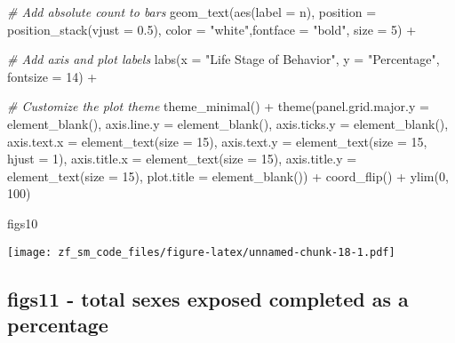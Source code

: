 \documentclass[
]{article}
\newenvironment{Shaded}{\begin{snugshade}}{\end{snugshade}}
\newcommand{\AttributeTok}[1]{\textcolor[rgb]{0.77,0.63,0.00}{#1}}
\newcommand{\CommentTok}[1]{\textcolor[rgb]{0.56,0.35,0.01}{\textit{#1}}}
\newcommand{\DecValTok}[1]{\textcolor[rgb]{0.00,0.00,0.81}{#1}}
\newcommand{\FloatTok}[1]{\textcolor[rgb]{0.00,0.00,0.81}{#1}}
\newcommand{\FunctionTok}[1]{\textcolor[rgb]{0.00,0.00,0.00}{#1}}
\newcommand{\NormalTok}[1]{#1}
\newcommand{\SpecialCharTok}[1]{\textcolor[rgb]{0.00,0.00,0.00}{#1}}
\newcommand{\StringTok}[1]{\textcolor[rgb]{0.31,0.60,0.02}{#1}}
\begin{document}
\begin{Shaded}
\begin{Highlighting}[]
  \CommentTok{\# Add absolute count to bars}
  \FunctionTok{geom\_text}\NormalTok{(}\FunctionTok{aes}\NormalTok{(}\AttributeTok{label =}\NormalTok{ n), }\AttributeTok{position =} \FunctionTok{position\_stack}\NormalTok{(}\AttributeTok{vjust =} \FloatTok{0.5}\NormalTok{), }\AttributeTok{color =} \StringTok{"white"}\NormalTok{,}\AttributeTok{fontface =} \StringTok{"bold"}\NormalTok{, }\AttributeTok{size =} \DecValTok{5}\NormalTok{) }\SpecialCharTok{+}
  
  \CommentTok{\# Add axis and plot labels }
  \FunctionTok{labs}\NormalTok{(}\AttributeTok{x =} \StringTok{"Life Stage of Behavior"}\NormalTok{, }\AttributeTok{y =} \StringTok{"Percentage"}\NormalTok{, }\AttributeTok{fontsize =} \DecValTok{14}\NormalTok{) }\SpecialCharTok{+}
  
  \CommentTok{\# Customize the plot theme }
  \FunctionTok{theme\_minimal}\NormalTok{() }\SpecialCharTok{+}
  \FunctionTok{theme}\NormalTok{(}\AttributeTok{panel.grid.major.y =} \FunctionTok{element\_blank}\NormalTok{(),}
    \AttributeTok{axis.line.y =} \FunctionTok{element\_blank}\NormalTok{(),}
    \AttributeTok{axis.ticks.y =} \FunctionTok{element\_blank}\NormalTok{(),}
    \AttributeTok{axis.text.x =} \FunctionTok{element\_text}\NormalTok{(}\AttributeTok{size =} \DecValTok{15}\NormalTok{),}
    \AttributeTok{axis.text.y =} \FunctionTok{element\_text}\NormalTok{(}\AttributeTok{size =} \DecValTok{15}\NormalTok{, }\AttributeTok{hjust =} \DecValTok{1}\NormalTok{),}
    \AttributeTok{axis.title.x =} \FunctionTok{element\_text}\NormalTok{(}\AttributeTok{size =} \DecValTok{15}\NormalTok{),}
    \AttributeTok{axis.title.y =} \FunctionTok{element\_text}\NormalTok{(}\AttributeTok{size =} \DecValTok{15}\NormalTok{),}
    \AttributeTok{plot.title =} \FunctionTok{element\_blank}\NormalTok{()) }\SpecialCharTok{+}
  \FunctionTok{coord\_flip}\NormalTok{() }\SpecialCharTok{+} 
  \FunctionTok{ylim}\NormalTok{(}\DecValTok{0}\NormalTok{, }\DecValTok{100}\NormalTok{)}

\NormalTok{figs10}
\end{Highlighting}
\end{Shaded}

\texttt{[image: zf\_sm\_code\_files/figure-latex/unnamed-chunk-18-1.pdf]}

\hypertarget{figs11---total-sexes-exposed-completed-as-a-percentage}{%
\subsection{figs11 - total sexes exposed completed as a
percentage}\label{figs11---total-sexes-exposed-completed-as-a-percentage}}
\end{document}
